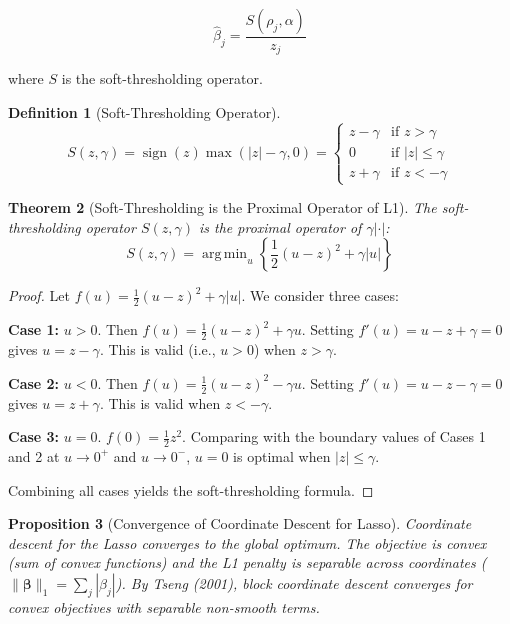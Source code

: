 \documentclass[11pt,a4paper]{article}
\newtheorem{theorem}{Theorem}[section]
\newtheorem{proposition}[theorem]{Proposition}
\theoremstyle{definition}
\newtheorem{definition}[theorem]{Definition}
\theoremstyle{remark}
\DeclareMathOperator*{\argmin}{arg\,min}
\DeclareMathOperator{\sign}{sign}
\begin{document}
\begin{equation}
\hat{\beta}_j = \frac{S(\rho_j, \alpha)}{z_j}
\end{equation}

where $S$ is the soft-thresholding operator.

\begin{definition}[Soft-Thresholding Operator]
\begin{equation}
S(z, \gamma) = \sign(z)\max(|z| - \gamma, 0) = \begin{cases}
z - \gamma & \text{if } z > \gamma \\
0 & \text{if } |z| \leq \gamma \\
z + \gamma & \text{if } z < -\gamma
\end{cases}
\end{equation}
\end{definition}

\begin{theorem}[Soft-Thresholding is the Proximal Operator of L1]
\label{thm:soft-thresh}
The soft-thresholding operator $S(z, \gamma)$ is the proximal operator of $\gamma|\cdot|$:
\begin{equation}
S(z, \gamma) = \argmin_u \left\{\frac{1}{2}(u - z)^2 + \gamma|u|\right\}
\end{equation}
\end{theorem}

\begin{proof}
Let $f(u) = \frac{1}{2}(u-z)^2 + \gamma|u|$. We consider three cases:

\textbf{Case 1:} $u > 0$. Then $f(u) = \frac{1}{2}(u-z)^2 + \gamma u$. Setting $f'(u) = u - z + \gamma = 0$ gives $u = z - \gamma$. This is valid (i.e., $u > 0$) when $z > \gamma$.

\textbf{Case 2:} $u < 0$. Then $f(u) = \frac{1}{2}(u-z)^2 - \gamma u$. Setting $f'(u) = u - z - \gamma = 0$ gives $u = z + \gamma$. This is valid when $z < -\gamma$.

\textbf{Case 3:} $u = 0$. $f(0) = \frac{1}{2}z^2$. Comparing with the boundary values of Cases 1 and 2 at $u \to 0^+$ and $u \to 0^-$, $u = 0$ is optimal when $|z| \leq \gamma$.

Combining all cases yields the soft-thresholding formula.
\end{proof}

\begin{proposition}[Convergence of Coordinate Descent for Lasso]
Coordinate descent for the Lasso converges to the global optimum. The objective is convex (sum of convex functions) and the L1 penalty is separable across coordinates ($\|\boldsymbol{\beta}\|_1 = \sum_j |\beta_j|$). By Tseng (2001), block coordinate descent converges for convex objectives with separable non-smooth terms.
\end{proposition}
\end{document}
